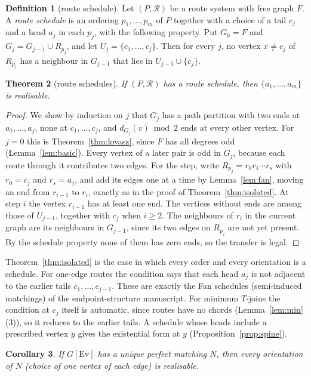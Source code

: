 \documentclass[11pt]{amsart}
\newtheorem{theorem}{Theorem}[section]
\newtheorem{corollary}[theorem]{Corollary}
\theoremstyle{definition}
\newtheorem{definition}[theorem]{Definition}
\newcommand{\Ev}{\mathrm{Ev}}
\newcommand{\cR}{\mathcal R}
\begin{document}
\begin{definition}[route schedule]
Let $(P,\cR)$ be a route system with free graph $F$. A \emph{route schedule} is an ordering
$p_1,\dots,p_m$ of $P$ together with a choice of a tail $c_j$ and a head $a_j$ in each $p_j$, with the
following property. Put $G_0=F$ and $G_j=G_{j-1}\cup R_{p_j}$, and let $U_j=\{c_1,\dots,c_j\}$. Then for
every $j$, no vertex $x\neq c_j$ of $R_{p_j}$ has a neighbour in $G_{j-1}$ that lies in $U_{j-1}\cup\{c_j\}$.
\end{definition}

\begin{theorem}[route schedules]\label{thm:schedule}
If $(P,\cR)$ has a route schedule, then $\{a_1,\dots,a_m\}$ is realisable.
\end{theorem}

\begin{proof}
We show by induction on $j$ that $G_j$ has a path partition with two ends at $a_1,\dots,a_j$, none at
$c_1,\dots,c_j$, and $d_{G_j}(v)\bmod2$ ends at every other vertex. For $j=0$ this is
Theorem~\ref{thm:lovasz}, since $F$ has all degrees odd (Lemma~\ref{lem:basic}). Every vertex of a later
pair is odd in $G_j$, because each route through it contributes two edges. For the step, write
$R_{p_j}=r_0r_1\cdots r_s$ with $r_0=c_j$ and $r_s=a_j$, and add its edges one at a time by
Lemma~\ref{lem:fan}, moving an end from $r_{i-1}$ to $r_i$, exactly as in the proof of
Theorem~\ref{thm:isolated}. At step $i$ the vertex $r_{i-1}$ has at least one end. The vertices without
ends are among those of $U_{j-1}$, together with $c_j$ when $i\ge2$. The neighbours of $r_i$ in the current
graph are its neighbours in $G_{j-1}$, since its two edges on $R_{p_j}$ are not yet present. By the
schedule property none of them has zero ends, so the transfer is legal.
\end{proof}

Theorem~\ref{thm:isolated} is the case in which every order and every orientation is a schedule. For
one-edge routes the condition says that each head $a_j$ is not adjacent to the earlier tails
$c_1,\dots,c_{j-1}$. These are exactly the Fan schedules (semi-induced matchings) of the
endpoint-structure manuscript. For minimum $T$-joins the condition at $c_j$ itself is automatic, since
routes have no chords (Lemma~\ref{lem:min}(3)), so it reduces to the earlier tails. A schedule whose
heads include a prescribed vertex $y$ gives the existential form at $y$
(Proposition~\ref{prop:spine}).

\begin{corollary}\label{cor:upm}
If $G[\Ev]$ has a unique perfect matching $N$, then every orientation of $N$ (choice of one vertex of
each edge) is realisable.
\end{corollary}
\end{document}
